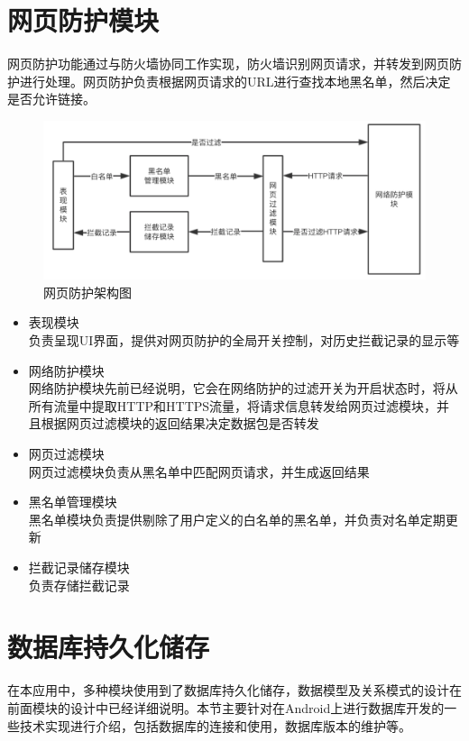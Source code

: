 \documentclass[format=final, language=chinese, degree=fyp]{hustthesis}
\begin{document}
\section{网页防护模块}


网页防护功能通过与防火墙协同工作实现，防火墙识别网页请求，并转发到网页防护进行处理。网页防护负责根据网页请求的URL进行查找本地黑名单，然后决定是否允许链接。

\begin{figure}[!h]
\centering
\includegraphics[width=1\textwidth]{function_3_ori.png}
\caption{网页防护架构图}\label{fig:4-3}
\end{figure}

\begin{itemize}
    \item 表现模块\\ 负责呈现UI界面，提供对网页防护的全局开关控制，对历史拦截记录的显示等
    \item 网络防护模块\\ 网络防护模块先前已经说明，它会在网络防护的过滤开关为开启状态时，将从所有流量中提取HTTP和HTTPS流量，将请求信息转发给网页过滤模块，并且根据网页过滤模块的返回结果决定数据包是否转发
    \item 网页过滤模块\\ 网页过滤模块负责从黑名单中匹配网页请求，并生成返回结果
    \item 黑名单管理模块\\ 黑名单模块负责提供剔除了用户定义的白名单的黑名单，并负责对名单定期更新
    \item 拦截记录储存模块\\ 负责存储拦截记录
\end{itemize}

\section{数据库持久化储存}

在本应用中，多种模块使用到了数据库持久化储存，数据模型及关系模式的设计在前面模块的设计中已经详细说明。本节主要针对在Android上进行数据库开发的一些技术实现进行介绍，包括数据库的连接和使用，数据库版本的维护等。
\end{document}
